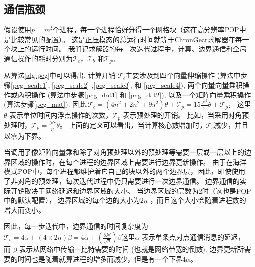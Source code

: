 \subsection{通信瓶颈}\label{se:bottleneck}
  
假设使用$p=m^2$个进程，每一个进程恰好分得一个网格块（这在高分辨率POP中是比较常见的配置）。 
这是正压模态的总运行时间就等于ChronGear求解器在每一个块上的运行时间。 
我们记求解器的每一次迭代过程中，计算、边界通信和全局通信操作的耗时分别为$\mathcal{T}_c$，$\mathcal{T}_b$ 和$\mathcal{T}_g$。 


从算法\ref{alg:pcg}中可以得出, 计算开销
$\mathcal{T}_c$主要涉及到四个向量伸缩操作 (算法中步骤\ref{pcg_scale1}, \ref{pcg_scale2} ,\ref{pcg_scale3}, 和
\ref{pcg_scale4}), 两个向量向量乘积操作或內积操作 (算法中步骤\ref{pcg_dot1} 和 \ref{pcg_dot2}), 以及一个矩阵向量乘积操作 (算法步骤\ref{pcg_mat}).  
因此,$\mathcal{T}_c= (4 n^2 +2n^2+ 9n^2)\theta + \mathcal{T}_{p}=15\frac{\mathcal{N}^2}{p}\theta+\mathcal{T}_{p}$，
这里$\theta$ 表示单位时间内浮点操作的次数，$\mathcal{T}_{p}$ 表示预处理的开销。
比如，当采用对角预处理时，$\mathcal{T}_{p} =\frac{\mathcal{N}^2}{p}\theta$。
上面的定义可以看出，当计算核心数增加时，$\mathcal{T}_c$减少，并且以零为下界。

 
当调用了像矩阵向量乘和除了对角预处理以外的预处理等需要一层或一层以上的边界区域的操作时，在每个进程的边界区域上需要进行边界更新操作。 
由于在海洋模式POP中，每个进程都维护着它自己的块以外的两个边界层，因此，即使使用了非对角的预处理，每次迭代过程中仍只需要进行一次边界通信。
边界通信的实际开销取决于网络延迟和边界区域的大小。 当边界区域的层数为2时（这也是POP中的默认配置）， 边界区域的每个边的大小为$2n$ ，而且这个大小会随着进程数的增大而变小。 
 
因此，每一步迭代中，边界通信的时间复杂度为$\mathcal{T}_b =4\alpha +(4\times 2n)\beta=4\alpha +(\frac{8\mathcal{N}}{\sqrt{p}})\beta $这里$\alpha$ 表示单条点对点通信消息的延迟，而
$\beta$ 表示从网络中传输一比特需要的时间 (也就是网络带宽的倒数).
边界更新所需要的时间也是随着就算进程的增多而减少，但是有一个下界$4\alpha$。 


